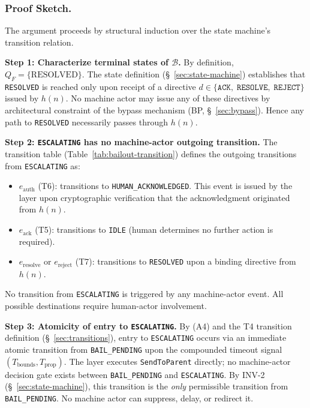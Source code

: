 \subsubsection{Proof Sketch.}

The argument proceeds by structural induction over the state machine's transition relation.

\medskip
\noindent\textbf{Step 1: Characterize terminal states of $\mathcal{B}$.} By definition, $Q_F = \{\text{RESOLVED}\}$. The state definition (\S~\ref{sec:state-machine}) establishes that \texttt{RESOLVED} is reached only upon receipt of a directive $d \in \{\texttt{ACK},\;\texttt{RESOLVE},\;\texttt{REJECT}\}$ issued by $h(n)$. No machine actor may issue any of these directives by architectural constraint of the bypass mechanism (BP, \S~\ref{sec:bypass}). Hence any path to \texttt{RESOLVED} necessarily passes through $h(n)$.

\medskip
\noindent\textbf{Step 2: \texttt{ESCALATING} has no machine-actor outgoing transition.} The transition table (Table~\ref{tab:bailout-transition}) defines the outgoing transitions from \texttt{ESCALATING} as:
\begin{itemize}
  \item $e_{\text{auth}}$ (T6): transitions to \texttt{HUMAN\_ACKNOWLEDGED}. This event is issued by the \fact{} layer upon cryptographic verification that the acknowledgment originated from $h(n)$.
  \item $e_{\text{ack}}$ (T5): transitions to \texttt{IDLE} (human determines no further action is required).
  \item $e_{\text{resolve}}$ or $e_{\text{reject}}$ (T7): transitions to \texttt{RESOLVED} upon a binding directive from $h(n)$.
\end{itemize}
No transition from \texttt{ESCALATING} is triggered by any machine-actor event. All possible destinations require human-actor involvement.

\medskip
\noindent\textbf{Step 3: Atomicity of entry to \texttt{ESCALATING}.} By (A4) and the T4 transition definition (\S~\ref{sec:transitions}), entry to \texttt{ESCALATING} occurs via an immediate atomic transition from \texttt{BAIL\_PENDING} upon the compounded timeout signal $(T_{\text{bounds}}, T_{\text{prop}})$. The \fact{} layer executes \texttt{SendToParent} directly; no machine-actor decision gate exists between \texttt{BAIL\_PENDING} and \texttt{ESCALATING}. By INV-2 (\S~\ref{sec:state-machine}), this transition is the \emph{only} permissible transition from \texttt{BAIL\_PENDING}. No machine actor can suppress, delay, or redirect it.


